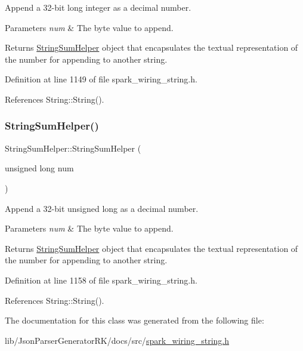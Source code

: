 Append a 32-\/bit long integer as a decimal number. 


\begin{DoxyParams}{Parameters}
{\em num} & The byte value to append.\\
\hline
\end{DoxyParams}
\begin{DoxyReturn}{Returns}
\hyperlink{class_string_sum_helper}{String\+Sum\+Helper} object that encapsulates the textual representation of the number for appending to another string. 
\end{DoxyReturn}


Definition at line 1149 of file spark\+\_\+wiring\+\_\+string.\+h.



References String\+::\+String().

\mbox{\label{class_string_sum_helper_ad05bd49f0b730d78d0a5dcf1b8c512eb}} 
\subsubsection{\texorpdfstring{String\+Sum\+Helper()}{StringSumHelper()}\hspace{0.1cm}{\footnotesize\ttfamily [8/8]}}
{\footnotesize\ttfamily String\+Sum\+Helper\+::\+String\+Sum\+Helper (\begin{DoxyParamCaption}\item[{unsigned long}]{num }\end{DoxyParamCaption})\hspace{0.3cm}{\ttfamily [inline]}}



Append a 32-\/bit unsigned long as a decimal number. 


\begin{DoxyParams}{Parameters}
{\em num} & The byte value to append.\\
\hline
\end{DoxyParams}
\begin{DoxyReturn}{Returns}
\hyperlink{class_string_sum_helper}{String\+Sum\+Helper} object that encapsulates the textual representation of the number for appending to another string. 
\end{DoxyReturn}


Definition at line 1158 of file spark\+\_\+wiring\+\_\+string.\+h.



References String\+::\+String().



The documentation for this class was generated from the following file\+:\begin{DoxyCompactItemize}
\item 
lib/\+Json\+Parser\+Generator\+R\+K/docs/src/\hyperlink{spark__wiring__string_8h}{spark\+\_\+wiring\+\_\+string.\+h}\end{DoxyCompactItemize}

